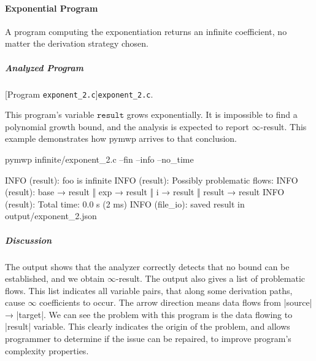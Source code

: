 \paragraph{Exponential Program}\label{exponential-program}
A program computing the exponentiation returns an infinite coefficient, no matter the derivation strategy chosen.

\subparagraph*{Analyzed Program}

\begin{center}
\begin{minipage}{\textwidth}
\captionsetup{type=lstlisting}
[Program \texttt{exponent\_2.c}]{\texttt{exponent\_2.c}.}
\label{lst:exponent2}
\end{minipage}
\end{center}

This program's variable \(\texttt{result}\) grows exponentially.
It is impossible to find a polynomial growth bound, and the analysis is expected to report \(\infty\)-result.
This example demonstrates how pymwp arrives to that conclusion.

\begin{center}
\begin{minipage}{\textwidth}
\begin{cmdlisting}[label={lst:ex2-run-cmd}]
pymwp infinite/exponent_2.c --fin --info --no_time
\end{cmdlisting}
\end{minipage}
\end{center}

\begin{center}
\begin{minipage}{\textwidth}
\begin{outlisting}[label={lst:ex2-output}]
INFO (result): foo is infinite
INFO (result): Possibly problematic flows:
INFO (result): base → result ‖ exp → result ‖ i → result ‖ result → result
INFO (result): Total time: 0.0 s (2 ms)
INFO (file_io): saved result in output/exponent_2.json
\end{outlisting}
\end{minipage}
\end{center}


\subparagraph*{Discussion}
The output shows that the analyzer correctly detects that no bound can
be established, and we obtain \(\infty\)-result.
The output also gives a list of problematic flows.
This list indicates all variable pairs, that along some derivation paths, cause \(\infty\) coefficients to occur.
The arrow direction means data flows from \pr|source| → \pr|target|.
We can see the problem with this program is the data flowing to \pr|result| variable.
This clearly indicates the origin of the problem, and allows programmer to determine if the issue can be
repaired, to improve program's complexity properties.

